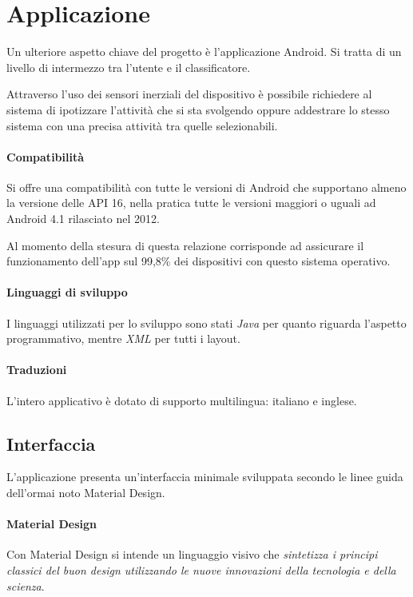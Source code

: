 \chapter{Applicazione}
\label{chapter:app}
Un ulteriore aspetto chiave del progetto è l'applicazione Android. 
Si tratta di un livello di intermezzo tra l'utente e il classificatore.

Attraverso l'uso dei sensori inerziali del dispositivo è possibile richiedere al sistema di ipotizzare l'attività che si sta svolgendo 
oppure addestrare lo stesso sistema con una precisa attività tra quelle selezionabili.




\subsubsection{Compatibilità}
Si offre una compatibilità con tutte le versioni di Android che supportano almeno la versione delle API 16, nella pratica tutte
le versioni maggiori o uguali ad Android 4.1 rilasciato nel 2012. 

Al momento della stesura di questa relazione corrisponde ad assicurare il funzionamento dell'app sul 99,8\% dei dispositivi 
con questo sistema operativo.

\subsubsection{Linguaggi di sviluppo}
I linguaggi utilizzati per lo sviluppo sono stati \textit{Java} per quanto riguarda l'aspetto programmativo, 
mentre \textit{XML} per tutti i layout.

\subsubsection{Traduzioni}
L'intero applicativo è dotato di supporto multilingua: italiano e inglese.


\newpage
\section{Interfaccia}
L'applicazione presenta un'interfaccia minimale sviluppata secondo le linee guida dell'ormai noto Material Design.

\subsubsection{Material Design}
Con Material Design \cite{material} si intende un linguaggio visivo che \textit{sintetizza i principi classici 
del buon design utilizzando le nuove innovazioni della tecnologia e della scienza}.

